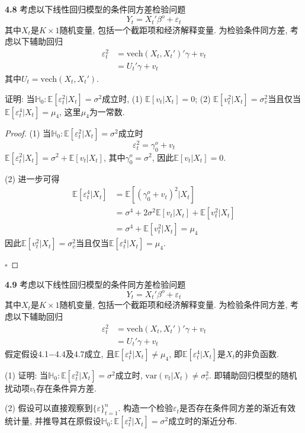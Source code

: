 \documentclass[cn,12pt,math=mtpro2,citestyle=gb7714-2015,bibstyle=gb7714-2015,twocol,mode=simple]{elegantbook}
\newcommand{\E}{\mathbb{E}}
\newcommand{\var}{\text{var}}
\begin{document}
\textbf{4.8} 考虑以下线性回归模型的条件同方差检验问题
  $$Y_t=X_t'\beta^o+\varepsilon_t$$
  其中$X_t$是$K\times1$随机变量, 包括一个截距项和经济解释变量. 为检验条件同方差, 考虑以下辅助回归
  \begin{align*}
  \varepsilon_t^2&=\text{vech}(X_t, X_t')'\gamma+v_t \\
  &=U_t'\gamma+v_t
  \end{align*}
  其中$U_t=\text{vech}(X_t,X_t')$.

证明: 当$\mathbb{H}_0: \E[\varepsilon_t^2|X_t]=\sigma^2$成立时, (1) $\E[v_t|X_t]=0$; (2) $\E[v_t^2|X_t]=\sigma_v^2$当且仅当$\E[\varepsilon_t^4|X_t]=\mu_4$, 这里$\mu_4$为一常数.

  \begin{proof}
    (1) 当$\mathbb{H}_0: \E[\varepsilon_t^2|X_t]=\sigma^2$成立时
    $$\varepsilon_t^2=\gamma_0^o+v_t$$
    $\E[\varepsilon_t^2|X_t]=\sigma^2+\E[v_t|X_t]$, 其中$\gamma_0^o=\sigma^2$, 因此$\E[v_t|X_t]=0$.

    (2) 进一步可得
    \begin{align*}
    \E[\varepsilon_t^4|X_t]&=\E[(\gamma_0^o+v_t)^2|X_t] \\
    &=\sigma^4+2\sigma^2\E[v_t|X_t]+\E[v_t^2|X_t] \\
    &=\sigma^4+\E[v_t^2|X_t]=\mu_4
    \end{align*}
    因此$\E[v_t^2|X_t]=\sigma_v^2$当且仅当$\E[\varepsilon_t^4|X_t]=\mu_4$.

    $\square$
  \end{proof}

\textbf{4.9} 考虑以下线性回归模型的条件同方差检验问题
  $$Y_t=X_t'\beta^o+\varepsilon_t$$
  其中$X_t$是$K\times1$随机变量, 包括一个截距项和经济解释变量. 为检验条件同方差, 考虑以下辅助回归
  \begin{align}
  \varepsilon_t^2&=\text{vech}(X_t, X_t')'\gamma+v_t \nonumber \\
  &=U_t'\gamma+v_t \label{eq4.2}\tag{4.2}
  \end{align}
  假定假设4.1$-$4.4及4.7成立, 且$\E[\varepsilon_t^4|X_t]\neq\mu_4$, 即$\E[\varepsilon_t^4|X_t]$是$X_t$的非负函数.

(1) 证明: 当$\mathbb{H}_0: \E[\varepsilon_t^2|X_t]=\sigma^2$成立时, $\var(v_t|X_t)\neq\sigma_v^2$. 即辅助回归模型的随机扰动项$v_t$存在条件异方差.

(2) 假设可以直接观察到$\{\varepsilon\}_{t=1}^n$. 构造一个检验$\varepsilon_t$是否存在条件同方差的渐近有效统计量, 并推导其在原假设$\mathbb{H}_0: \E[\varepsilon_t^2|X_t]=\sigma^2$成立时的渐近分布.
\end{document}
